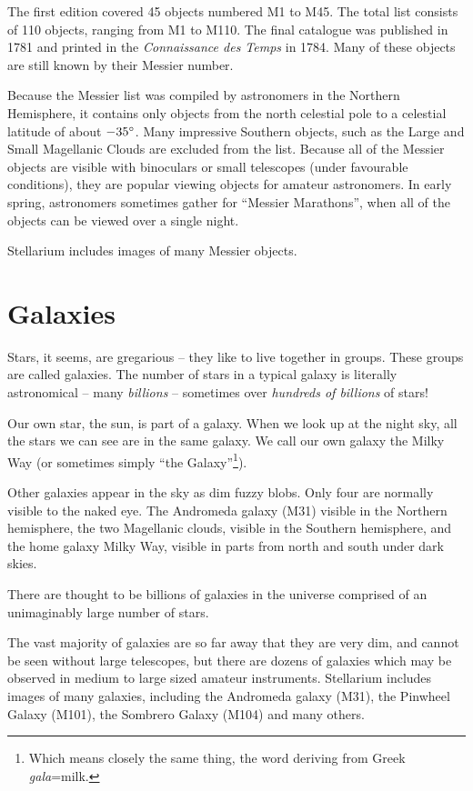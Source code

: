 The first edition covered 45 objects numbered M1 to M45. The total list
consists of 110 objects, ranging from M1 to M110. The final catalogue
was published in 1781 and printed in the \emph{Connaissance des Temps}
in 1784. Many of these objects are still known by their Messier number.

Because the Messier list was compiled by astronomers in the Northern
Hemisphere, it contains only objects from the north celestial pole to a
celestial latitude of about $-35\degree$. Many impressive Southern objects, such
as the Large  and Small  
Magellanic Clouds are excluded from the list.
Because all of the Messier objects are visible with binoculars or small
telescopes (under favourable conditions), they are popular viewing
objects for amateur astronomers. In early spring, astronomers sometimes
gather for ``Messier Marathons'', when all of the objects can be viewed
over a single night.

Stellarium includes images of many Messier objects.


\section{Galaxies}
\label{sec:Phenomena:Galaxies}

Stars, it seems, are gregarious -- they like to live together in groups.
These groups are called galaxies. The number of stars in a typical
galaxy is literally astronomical -- many \emph{billions} -- sometimes over
\emph{hundreds of billions} of stars!

Our own star, the sun, is part of a galaxy. When we look up at the
night sky, all the stars we can see are in the same galaxy. We call
our own galaxy the Milky Way (or sometimes simply ``the
Galaxy''\footnote{Which means closely the same thing, the word
  deriving from Greek \emph{gala}=milk.}).

Other galaxies appear in the sky as dim fuzzy blobs. Only four are
normally visible to the naked eye. The Andromeda galaxy (M31) visible in
the Northern hemisphere, the two Magellanic clouds, visible in the
Southern hemisphere, and the home galaxy Milky Way, visible in parts
from north and south under dark skies.

There are thought to be billions of galaxies in the universe comprised
of an unimaginably large number of stars.

The vast majority of galaxies are so far away that they are very dim,
and cannot be seen without large telescopes, but there are dozens of
galaxies which may be observed in medium to large sized amateur
instruments. Stellarium includes images of many galaxies, including the
Andromeda galaxy (M31), the Pinwheel Galaxy (M101), the Sombrero Galaxy
(M104) and many others.

